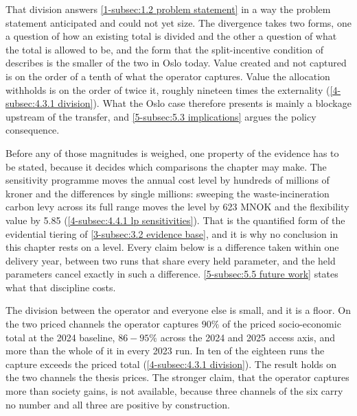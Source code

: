 That division answers \autoref{1-subsec:1.2 problem statement} in a way the problem statement anticipated and could not yet size. The divergence takes two forms, one a question of how an existing total is divided and the other a question of what the total is allowed to be, and the form that the split-incentive condition of \cite{sneum_barriers_2021} describes is the smaller of the two in Oslo today. Value created and not captured is on the order of a tenth of what the operator captures. Value the allocation withholds is on the order of twice it, roughly nineteen times the externality (\autoref{4-subsec:4.3.1 division}). What the Oslo case therefore presents is mainly a blockage upstream of the transfer, and \autoref{5-subsec:5.3 implications} argues the policy consequence.

Before any of those magnitudes is weighed, one property of the evidence has to be stated, because it decides which comparisons the chapter may make. The sensitivity programme moves the annual cost level by hundreds of millions of kroner and the differences by single millions: sweeping the waste-incineration carbon levy across its full range moves the level by 623 MNOK and the flexibility value by 5.85 (\autoref{4-subsec:4.4.1 lp sensitivities}). That is the quantified form of the evidential tiering of \autoref{3-subsec:3.2 evidence base}, and it is why no conclusion in this chapter rests on a level. Every claim below is a difference taken within one delivery year, between two runs that share every held parameter, and the held parameters cancel exactly in such a difference. \autoref{5-subsec:5.5 future work} states what that discipline costs.

The division between the operator and everyone else is small, and it is a floor. On the two priced channels the operator captures $90\%$ of the priced socio-economic total at the 2024 baseline, $86 - 95\%$ across the 2024 and 2025 access axis, and more than the whole of it in every 2023 run. In ten of the eighteen runs the capture exceeds the priced total (\autoref{4-subsec:4.3.1 division}). The result holds on the two channels the thesis prices. The stronger claim, that the operator captures more than society gains, is not available, because three channels of the six carry no number and all three are positive by construction.

